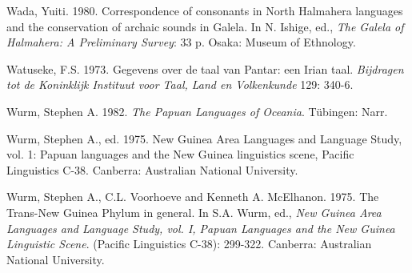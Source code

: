 Wada, Yuiti. 1980. Correspondence of consonants in North Halmahera languages and the conservation of archaic sounds in Galela. In N. Ishige, ed., \textit{The Galela of Halmahera: A Preliminary Survey}: 33 p. Osaka: Museum of Ethnology.

Watuseke, F.S. 1973. Gegevens over de taal van Pantar: een Irian taal. \textit{Bijdragen tot de Koninklijk Instituut voor Taal, Land en Volkenkunde} 129: 340-6.

Wurm, Stephen A. 1982. \textit{The Papuan Languages of Oceania}. T\"ubingen: Narr.

Wurm, Stephen A., ed. 1975. New Guinea Area Languages and Language Study, vol. 1: Papuan languages and the New Guinea linguistics scene, Pacific Linguistics C-38. Canberra: Australian National University.

Wurm, Stephen A., C.L. Voorhoeve and Kenneth A. McElhanon. 1975. The Trans-New Guinea Phylum in general. In S.A. Wurm, ed., \textit{New Guinea Area Languages and Language Study, vol. I, Papuan Languages and the New Guinea Linguistic Scene}. (Pacific Linguistics C-38): 299-322. Canberra: Australian National University.

